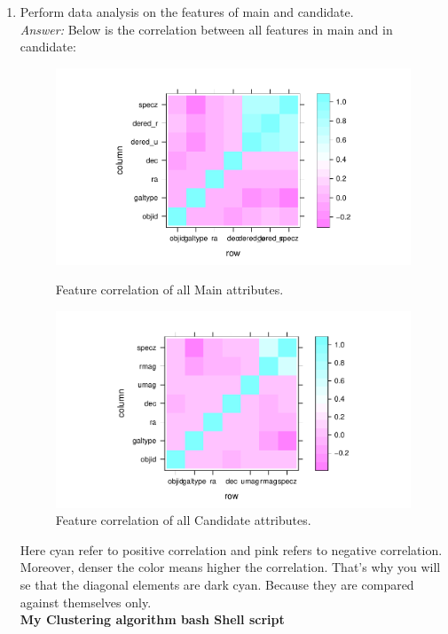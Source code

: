 \documentclass{article}
\begin{document}
\begin{enumerate}[1.]
\pagebreak
	\item Perform data analysis on the features of main and candidate.\\
	\emph{Answer:}
	Below is the correlation between all features in main and in candidate:
\begin{figure}[ht]
\includegraphics{corMain.pdf}
\caption{ Feature correlation of all Main attributes.}

\includegraphics{corCandidate.pdf}
\caption{ Feature correlation of all Candidate attributes.}
\end{figure}

Here cyan refer to positive correlation and pink refers to negative correlation. Moreover, denser the color means higher the correlation. That's why you will se that the diagonal elements are dark cyan. Because they are compared against themselves only. \\

\textbf{My Clustering algorithm bash Shell script} \\
\end{enumerate}
\end{document}
